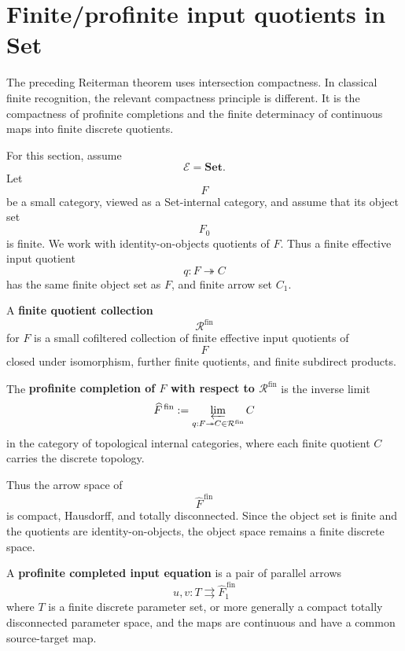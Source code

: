 \section{Finite/profinite input quotients in Set}
\label{sec:reiterman-finite-profinite-input-quotients}

The preceding Reiterman theorem uses intersection compactness. In classical
finite recognition, the relevant compactness principle is different. It is
the compactness of profinite completions and the finite determinacy of
continuous maps into finite discrete quotients.

For this section, assume
\[
\mathcal E=\mathbf{Set}.
\]
Let
\[
F
\]
be a small category, viewed as a Set-internal category, and assume that its
object set
\[
F_0
\]
is finite. We work with identity-on-objects quotients of \(F\). Thus a finite
effective input quotient
\[
q:F\twoheadrightarrow C
\]
has the same finite object set as \(F\), and finite arrow set \(C_1\).

\begin{definition}
\label{def:reiterman-finite-quotient-collection}
A \textbf{finite quotient collection}
\[
\mathcal R^{\mathrm{fin}}
\]
for \(F\) is a small cofiltered collection of finite effective input
quotients of
\[
F
\]
closed under isomorphism, further finite quotients, and finite subdirect
products.
\end{definition}

\begin{definition}
\label{def:reiterman-profinite-completion}
The \textbf{profinite completion of \(F\) with respect to
\(\mathcal R^{\mathrm{fin}}\)} is the inverse limit
\[
\widehat F^{\,\mathrm{fin}}
:=
\varprojlim_{q:F\twoheadrightarrow C\in\mathcal R^{\mathrm{fin}}} C
\]
in the category of topological internal categories, where each finite
quotient \(C\) carries the discrete topology.
\end{definition}

Thus the arrow space of
\[
\widehat F^{\,\mathrm{fin}}
\]
is compact, Hausdorff, and totally disconnected. Since the object set is
finite and the quotients are identity-on-objects, the object space remains a
finite discrete space.

\begin{definition}
\label{def:reiterman-profinite-completed-equation}
A \textbf{profinite completed input equation} is a pair of parallel arrows
\[
u,v:T\rightrightarrows \widehat F^{\,\mathrm{fin}}_1
\]
where \(T\) is a finite discrete parameter set, or more generally a compact
totally disconnected parameter space, and the maps are continuous and have a
common source-target map.
\end{definition}


